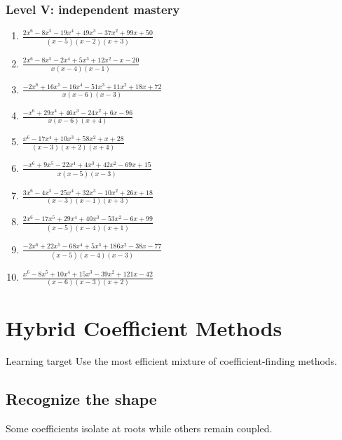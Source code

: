 \documentclass[11pt,oneside]{book}
\begin{document}
\subsection*{Level V: independent mastery}
\begin{enumerate}[leftmargin=*,label=\textbf{\arabic*.},itemsep=0.65\baselineskip]
\item $\displaystyle \frac{2 x^{6} - 8 x^{5} - 19 x^{4} + 49 x^{3} - 37 x^{2} + 99 x + 50}{\left(x - 5\right) \left(x - 2\right) \left(x + 3\right)}$
\item $\displaystyle \frac{2 x^{6} - 8 x^{5} - 2 x^{4} + 5 x^{3} + 12 x^{2} - x - 20}{x \left(x - 4\right) \left(x - 1\right)}$
\item $\displaystyle \frac{- 2 x^{6} + 16 x^{5} - 16 x^{4} - 51 x^{3} + 11 x^{2} + 18 x + 72}{x \left(x - 6\right) \left(x - 3\right)}$
\item $\displaystyle \frac{- x^{6} + 29 x^{4} + 46 x^{3} - 24 x^{2} + 6 x - 96}{x \left(x - 6\right) \left(x + 4\right)}$
\item $\displaystyle \frac{x^{6} - 17 x^{4} + 10 x^{3} + 58 x^{2} + x + 28}{\left(x - 3\right) \left(x + 2\right) \left(x + 4\right)}$
\item $\displaystyle \frac{- x^{6} + 9 x^{5} - 22 x^{4} + 4 x^{3} + 42 x^{2} - 69 x + 15}{x \left(x - 5\right) \left(x - 3\right)}$
\item $\displaystyle \frac{3 x^{6} - 4 x^{5} - 25 x^{4} + 32 x^{3} - 10 x^{2} + 26 x + 18}{\left(x - 3\right) \left(x - 1\right) \left(x + 3\right)}$
\item $\displaystyle \frac{2 x^{6} - 17 x^{5} + 29 x^{4} + 40 x^{3} - 53 x^{2} - 6 x + 99}{\left(x - 5\right) \left(x - 4\right) \left(x + 1\right)}$
\item $\displaystyle \frac{- 2 x^{6} + 22 x^{5} - 68 x^{4} + 5 x^{3} + 186 x^{2} - 38 x - 77}{\left(x - 5\right) \left(x - 4\right) \left(x - 3\right)}$
\item $\displaystyle \frac{x^{6} - 8 x^{5} + 10 x^{4} + 15 x^{3} - 39 x^{2} + 121 x - 42}{\left(x - 6\right) \left(x - 3\right) \left(x + 2\right)}$
\end{enumerate}
\chapter{Hybrid Coefficient Methods}
\begin{rulebox}{Learning target}
Use the most efficient mixture of coefficient-finding methods.
\end{rulebox}
\section{Recognize the shape}
Some coefficients isolate at roots while others remain coupled.
\end{document}
